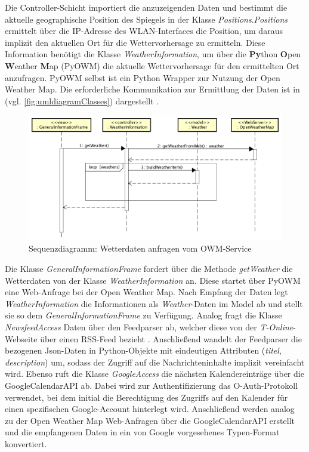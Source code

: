 \begin{minipage}{\textwidth}
	
\end{minipage}
 
Die Controller-Schicht importiert die anzuzeigenden Daten und bestimmt die aktuelle geographische Position des Spiegels in der Klasse  \textit{Positions}.\textit{Positions} ermittelt über die IP-Adresse des WLAN-Interfaces die Position, um daraus implizit den aktuellen Ort für die Wettervorhersage zu ermitteln. Diese Information benötigt die Klasse \textit{WeatherInformation}, um über die \textbf{Py}thon \textbf{O}pen \textbf{W}eather \textbf{M}ap (PyOWM) die aktuelle Wettervorhersage für den ermittelten Ort anzufragen. PyOWM selbst ist ein Python Wrapper zur Nutzung der Open Weather Map. Die erforderliche Kommunikation zur Ermittlung der Daten ist in (vgl. \autoref{fig:umldiagramClasses}) dargestellt \cite{pyowm}.
 \begin{figure}
 	\centering
 	\includegraphics[width=0.8\linewidth]{bilder/sequenceDiagramGettingData_v2}
 	\caption{Sequenzdiagramm: Wetterdaten anfragen vom OWM-Service}
 	\label{fig:sequenzDiagramData}
 \end{figure}

 Die Klasse \textit{GeneralInformationFrame} fordert über die Methode \textit{getWeather} die Wetterdaten von der Klasse \textit{WeatherInformation} an. Diese startet über PyOWM eine Web-Anfrage bei der Open Weather Map. Nach Empfang der Daten legt \textit{WeatherInformation} die Informationen als \textit{Weather}-Daten im Model ab und stellt sie so dem \textit{GeneralInformationFrame} zu Verfügung. 
 Analog fragt die Klasse \textit{NewsfeedAccess} Daten über den Feedparser ab, welcher diese von der \textit{T-Online}-Webseite über einen RSS-Feed bezieht \cite{vayssiere2004system}. Anschließend wandelt der Feedparser die bezogenen Json-Daten in Python-Objekte mit eindeutigen Attributen (\textit{titel}, \textit{description}) um, sodass der Zugriff auf die Nachrichteninhalte implizit vereinfacht wird.
 Ebenso ruft die Klasse \textit{GoogleAccess} die nächsten Kalendereinträge über die GoogleCalendarAPI ab. Dabei wird zur Authentifizierung das O-Auth-Protokoll verwendet, bei dem initial die Berechtigung des Zugriffs auf den Kalender für einen spezifischen Google-Account hinterlegt wird. Anschließend werden analog zu der Open Weather Map Web-Anfragen über die GoogleCalendarAPI erstellt und die empfangenen Daten in ein von Google vorgesehenes Typen-Format konvertiert. \cite{boyd2012getting}
 
